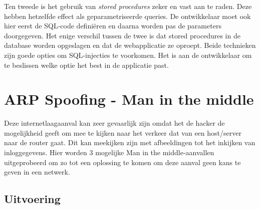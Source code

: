 \documentclass[pdftex,a4paper,12pt]{report}
\begin{document}
Ten tweede is het gebruik van \textit{stored procedures} zeker en vast aan te raden. Deze hebben hetzelfde effect als geparametriseerde queries. De ontwikkelaar moet ook hier eerst de SQL-code definiëren en daarna worden pas de parameters doorgegeven. Het enige verschil tussen de twee is dat stored procedures in de database worden opgeslagen en dat de webapplicatie ze oproept. Beide technieken zijn goede opties om SQL-injecties te voorkomen. Het is aan de ontwikkelaar om te beslissen welke optie het best in de applicatie past. \citep{Wichers2013}

\section{ARP Spoofing - Man in the middle}
Deze internetlaagaanval kan zeer gevaarlijk zijn omdat het de hacker de mogelijkheid geeft om mee te kijken naar het verkeer dat van een host/server naar de router gaat. Dit kan meekijken zijn met afbeeldingen tot het inkijken van inloggegevens. Hier worden 3 mogelijke Man in the middle-aanvallen uitgeprobeerd om zo tot een oplossing te komen om deze aanval geen kans te geven in een netwerk.

\subsection{Uitvoering}
\end{document}
